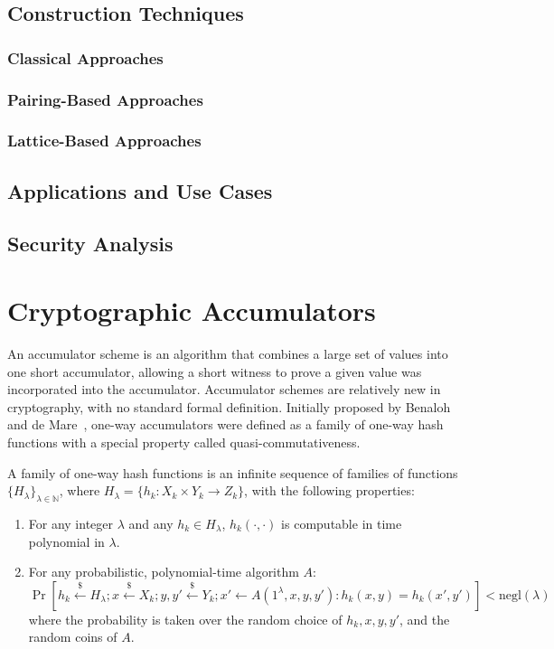 \documentclass{iacrcc}
\begin{document}
\subsection{Construction Techniques}
\subsubsection{Classical Approaches}
\subsubsection{Pairing-Based Approaches}
\subsubsection{Lattice-Based Approaches}

\subsection{Applications and Use Cases}
\subsection{Security Analysis}

\section{Cryptographic Accumulators}

An accumulator scheme is an algorithm that combines a large set of values into one short accumulator, allowing a short witness to prove a given value was incorporated into the accumulator. Accumulator schemes are relatively new in cryptography, with no standard formal definition. Initially proposed by Benaloh and de Mare~\cite{EC:BenDeM93}, one-way accumulators were defined as a family of one-way hash functions with a special property called quasi-commutativeness.

\begin{definition}
A family of one-way hash functions is an infinite sequence of families of functions \(\{H_\lambda\}_{\lambda \in \mathbb{N}}\), where \(H_\lambda = \{h_k : X_k \times Y_k \to Z_k\}\), with the following properties:
\begin{enumerate}
    \item For any integer \(\lambda\) and any \(h_k \in H_\lambda\), \(h_k(\cdot, \cdot)\) is computable in time polynomial in \(\lambda\).
    \item For any probabilistic, polynomial-time algorithm \(A\):
    \[
    \Pr\left[h_k \xleftarrow{\$} H_\lambda; x \xleftarrow{\$} X_k; y, y' \xleftarrow{\$} Y_k; x' \leftarrow A(1^\lambda, x, y, y') : h_k(x, y) = h_k(x', y')\right] < \text{negl}(\lambda)
    \]
    where the probability is taken over the random choice of \(h_k, x, y, y'\), and the random coins of \(A\).
\end{enumerate}    
\end{definition}
\end{document}
